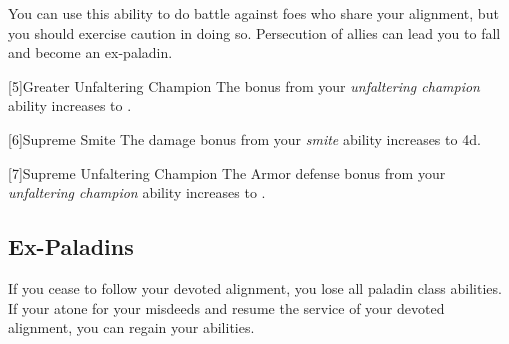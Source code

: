         You can use this ability to do battle against foes who share your alignment, but you should exercise caution in doing so.
        Persecution of allies can lead you to fall and become an ex-paladin.

        [5]{Greater Unfaltering Champion} The  bonus from your \textit{unfaltering champion} ability increases to .

        [6]{Supreme Smite} The damage bonus from your \textit{smite} ability increases to \plus4d.

        [7]{Supreme Unfaltering Champion}
        The Armor defense bonus from your \textit{unfaltering champion} ability increases to .


    \subsection{Ex-Paladins}
        If you cease to follow your devoted alignment, you lose all  paladin class abilities.
        If your atone for your misdeeds and resume the service of your devoted alignment, you can regain your abilities.

\newpage
